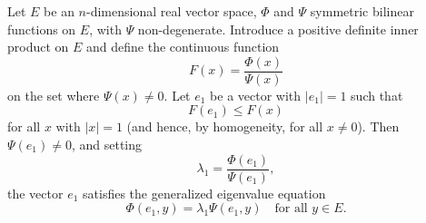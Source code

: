 Let $E$ be an $n$-dimensional real vector space, $\Phi$ and $\Psi$ symmetric bilinear functions on $E$, with $\Psi$ non-degenerate. Introduce a positive definite inner product on $E$ and define the continuous function
$$F(x) = \frac{\Phi(x)}{\Psi(x)}$$
on the set where $\Psi(x) \neq 0$. Let $e_1$ be a vector with $|e_1| = 1$ such that
$$F(e_1) \leq F(x)$$
for all $x$ with $|x| = 1$ (and hence, by homogeneity, for all $x \neq 0$). Then $\Psi(e_1) \neq 0$, and setting
$$\lambda_1 = \frac{\Phi(e_1)}{\Psi(e_1)},$$
the vector $e_1$ satisfies the generalized eigenvalue equation
$$\Phi(e_1, y) = \lambda_1 \Psi(e_1, y) \quad \text{for all } y \in E.$$
